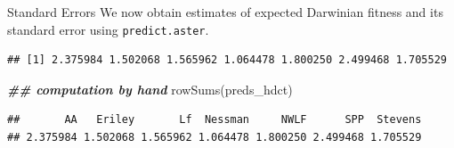 \documentclass[
  ignorenonframetext,
]{beamer}
\newenvironment{Shaded}{\begin{snugshade}}{\end{snugshade}}
\newcommand{\AttributeTok}[1]{\textcolor[rgb]{0.77,0.63,0.00}{#1}}
\newcommand{\ConstantTok}[1]{\textcolor[rgb]{0.00,0.00,0.00}{#1}}
\newcommand{\DocumentationTok}[1]{\textcolor[rgb]{0.56,0.35,0.01}{\textbf{\textit{#1}}}}
\newcommand{\FunctionTok}[1]{\textcolor[rgb]{0.00,0.00,0.00}{#1}}
\newcommand{\NormalTok}[1]{#1}
\newcommand{\OtherTok}[1]{\textcolor[rgb]{0.56,0.35,0.01}{#1}}
\newcommand{\SpecialCharTok}[1]{\textcolor[rgb]{0.00,0.00,0.00}{#1}}
\begin{document}
\begin{frame}[fragile]{Standard Errors}
\protect\hypertarget{standard-errors}{}
We now obtain estimates of expected Darwinian fitness and its standard
error using \texttt{predict.aster}.

\vspace{12pt}
\tiny

\begin{Shaded}
\end{Shaded}

\begin{verbatim}
## [1] 2.375984 1.502068 1.565962 1.064478 1.800250 2.499468 1.705529
\end{verbatim}

\begin{Shaded}
\begin{Highlighting}[]
\DocumentationTok{\#\# computation by hand}
\FunctionTok{rowSums}\NormalTok{(preds\_hdct)}
\end{Highlighting}
\end{Shaded}

\begin{verbatim}
##       AA   Eriley       Lf  Nessman     NWLF      SPP  Stevens 
## 2.375984 1.502068 1.565962 1.064478 1.800250 2.499468 1.705529
\end{verbatim}
\end{frame}
\end{document}
